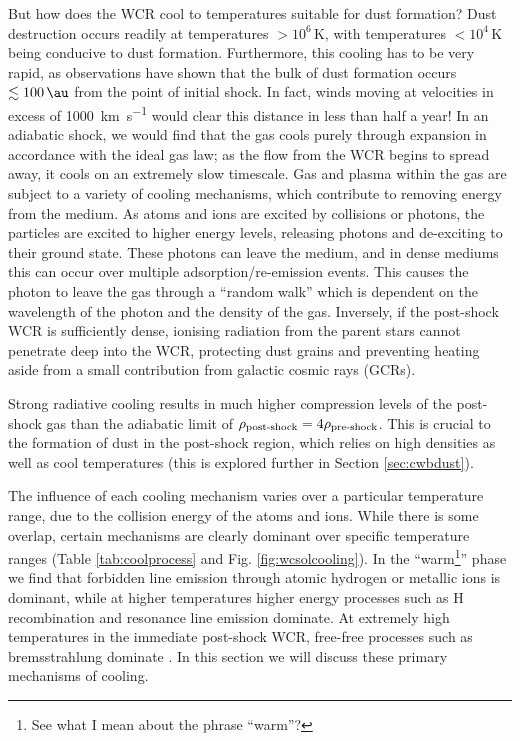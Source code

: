 But how does the WCR cool to temperatures suitable for dust formation?
Dust destruction occurs readily at temperatures $>10^6\, \si{\kelvin}$, with temperatures $<10^4\,\si{\kelvin}$ being conducive to dust formation.
Furthermore, this cooling has to be very rapid, as observations have shown that the bulk of dust formation occurs $\lesssim \SI{100}{\au}$ from the point of initial shock.
In fact, winds moving at velocities in excess of \SI{1000}{\kilo\metre\per\second} would clear this distance in less than half a year!
In an adiabatic shock, we would find that the gas cools purely through expansion in accordance with the ideal gas law; as the flow from the WCR begins to spread away, it cools on an extremely slow timescale.
Gas and plasma within the gas are subject to a variety of cooling mechanisms, which contribute to removing energy from the medium.
As atoms and ions are excited by collisions or photons, the particles are excited to higher energy levels, releasing photons and de-exciting to their ground state.
These photons can leave the medium, and in dense mediums this can occur over multiple adsorption/re-emission events.
This causes the photon to leave the gas through a ``random walk'' which is dependent on the wavelength of the photon and the density of the gas.
Inversely, if the post-shock WCR is sufficiently dense, ionising radiation from the parent stars cannot penetrate deep into the WCR, protecting dust grains and preventing heating aside from a small contribution from galactic cosmic rays (GCRs).

Strong radiative cooling results in much higher compression levels of the post-shock gas than the adiabatic limit of $\rho_\text{post-shock} = 4\rho_\text{pre-shock}$.
This is crucial to the formation of dust in the post-shock region, which relies on high densities as well as cool temperatures (this is explored further in Section \ref{sec:cwbdust}).

The influence of each cooling mechanism varies over a particular temperature range, due to the collision energy of the atoms and ions.
While there is some overlap, certain mechanisms are clearly dominant over specific temperature ranges (Table \ref{tab:coolprocess} and Fig. \ref{fig:wcsolcooling}).
In the ``warm\footnote{See what I mean about the phrase ``warm''?}'' phase we find that forbidden line emission through atomic hydrogen or metallic ions is dominant, while at higher temperatures higher energy processes such as H recombination and resonance line emission dominate.
At extremely high temperatures in the immediate post-shock WCR, free-free processes such as bremsstrahlung dominate
\parencite[Ch.~6]{dysonPhysicsInterstellarMedium2021}.
In this section we will discuss these primary mechanisms of cooling.


